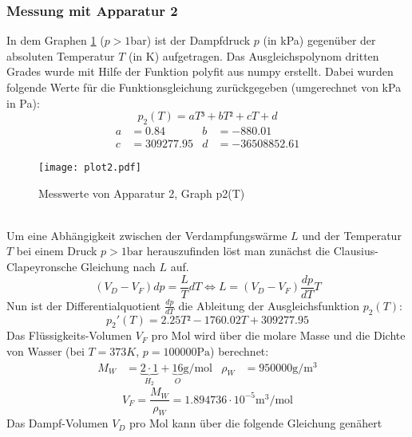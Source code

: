    \subsubsection{Messung mit Apparatur 2}
  \label{sec: MmA2}
  In dem Graphen \ref{fig:p2(T)} ($p > 1$\si{\bar}) ist der Dampfdruck
  $p$ (in \si{\kPa}) gegenüber der absoluten Temperatur $T$ (in \si{\kelvin})
  aufgetragen. Das Ausgleichspolynom dritten Grades wurde mit Hilfe der
  Funktion polyfit aus numpy erstellt.
  Dabei wurden folgende Werte für die Funktionsgleichung zurückgegeben
  (umgerechnet von \si{\kPa} in \si{\Pa}):
  \begin{equation}
    p_2(T) = aT³ + bT² + cT + d
  \end{equation}
  \begin{align}
    a & = 0.84 & b & = -880.01 \\
    c & = 309277.95 & d & = -36508852.61
  \end{align}
  \begin{figure}[h]
    \centering
    \texttt{[image: plot2.pdf]}
    \caption{Messwerte von Apparatur 2, Graph p2(T)}
    \label{fig:p2(T)}
  \end{figure}
  \\
  Um eine Abhängigkeit zwischen der Verdampfungswärme $L$ und der Temperatur
  $T$ bei einem Druck $p > 1\si{\bar}$ herauszufinden löst man zunächst die
  Clausius-Clapeyronsche Gleichung nach $L$ auf.
  \begin{equation}
    (V_D - V_F) dp = \frac{L}{T} dT
    \iff L = (V_D - V_F) \frac{dp}{dT} T
  \end{equation}
  Nun ist der Differentialquotient $\frac{dp}{dT}$ die Ableitung der
  Ausgleichsfunktion $p_2(T)$:
  \begin{equation}
    p_2'(T) = 2.25 T² - 1760.02 T + 309277.95
  \end{equation}
  Das Flüssigkeits-Volumen $V_F$ pro Mol wird über die molare Masse und die
  Dichte von Wasser\cite{stoffwerte}
  (bei $T = 373 K$, $p = 100000 \si{\Pa}$) berechnet:
  \begin{align}
    M_W & = \underbrace{2 \cdot 1}_{H_2} + \underbrace{16}_{O}
    \si{\gram\per\mol} & \rho_W & = 950000 \si{\gram\per\cubic\meter}
  \end{align}
  \begin{equation}
    V_F = \frac{M_W}{\rho_W} = 1.894736 \cdot 10^{-5} \si{\cubic\meter\per\mol}
  \end{equation}
  Das Dampf-Volumen $V_D$ pro Mol kann über die folgende Gleichung genähert
